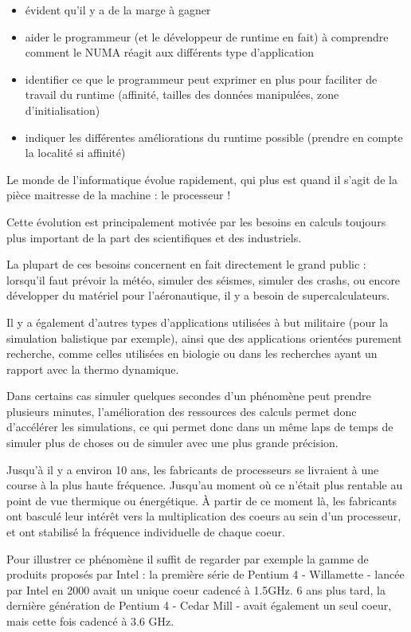 \begin{itemize}
  \begin{itemize}
    \item évident qu'il y a de la marge à gagner
    \item aider le programmeur (et le développeur de runtime en fait) à comprendre comment le NUMA réagit aux différents type d'application
    \item identifier ce que le programmeur peut exprimer en plus pour faciliter de travail du runtime (affinité, tailles des données manipulées, zone d'initialisation)
    \item indiquer les différentes améliorations du runtime possible (prendre en compte la localité si affinité)
  \end{itemize}
\end{itemize}


Le monde de l'informatique évolue rapidement, qui plus est quand il s'agit de la pièce maitresse de la machine : le processeur !

Cette évolution est principalement motivée par les besoins en calculs toujours plus important de la part des scientifiques et des industriels.

La plupart de ces besoins concernent en fait directement le grand public : lorsqu'il faut prévoir la météo, simuler des séismes, simuler des crashs, ou encore développer du matériel pour l'aéronautique, il y a besoin de supercalculateurs.

Il y a également d'autres types d'applications utilisées à but militaire (pour la simulation balistique par exemple), ainsi que des applications orientées purement recherche, comme celles utilisées en biologie ou dans les recherches ayant un rapport avec la thermo dynamique.

Dans certains cas simuler quelques secondes d'un phénomène peut prendre plusieurs minutes, l'amélioration des ressources des calculs permet donc d'accélérer les simulations, ce qui permet donc dans un même laps de temps de simuler plus de choses ou de simuler avec une plus grande précision.

Jusqu'à il y a environ 10 ans, les fabricants de processeurs se livraient à une course à la plus haute fréquence.
Jusqu'au moment où ce n'était plus rentable au point de vue thermique ou énergétique. À partir de ce moment là, les fabricants ont basculé leur intérêt vers la multiplication des coeurs au sein d'un processeur, et ont stabilisé la fréquence individuelle de chaque coeur.

Pour illustrer ce phénomène il suffit de regarder par exemple la gamme de produits proposés par Intel : la première série de Pentium 4 - Willamette - lancée par Intel en 2000 avait un unique coeur cadencé à 1.5GHz. 6 ans plus tard, la dernière génération de Pentium 4 - Cedar Mill - avait également un seul coeur, mais cette fois cadencé à 3.6 GHz.

